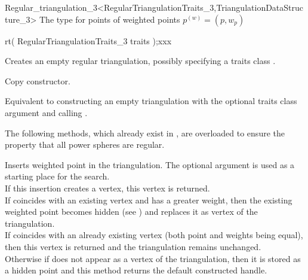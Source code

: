\begin{ccRefClass}{Regular_triangulation_3<RegularTriangulationTraits_3,TriangulationDataStructure_3>}
{The type for points
 of weighted points ${p}^{(w)}=(p,w_p)$}
\ccGlue
{}

\ccCreation
{}


{rt( RegularTriangulationTraits_3 traits );xxx}{}

{Creates an empty regular triangulation, possibly specifying a traits class
.}

 {Copy constructor.}

{Equivalent to constructing an empty triangulation with the optional 
traits class argument and calling .}

\ccOperations



The following methods, which already exist in , are
overloaded to ensure the property that all power spheres are regular.

{Inserts weighted point  in the triangulation. The optional 
argument  is used as a starting place for the search.\\
If this insertion creates a vertex, this vertex is returned.\\
If  coincides with an existing vertex and has a greater weight, 
then the existing weighted point becomes hidden (see 
) and  replaces it as vertex 
of the triangulation.\\
If  coincides with an already existing vertex (both point and 
weights being equal), then this vertex is returned and the triangulation 
remains unchanged.\\
Otherwise if  does not appear as a vertex of the triangulation, 
then it is stored as a hidden point and this method returns the default 
constructed handle.}


\end{ccRefClass}

